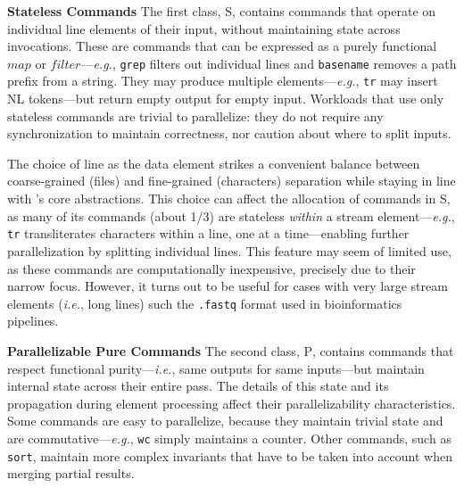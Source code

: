 \documentclass[letterpaper,twocolumn,10pt]{article}
\newcommand{\eg}{{\em e.g.}, }
\newcommand{\ie}{{\em i.e.}, }
\newcommand{\heading}[1]{\vspace{4pt}\noindent\textbf{#1}\enspace}
\newcommand{\ttt}[1]{\texttt{#1}}
\newcommand{\cn}[1]{\mbox{\textcircled{\footnotesize #1}}}
\newcommand{\sta}{\cn{\textsc{S}}\xspace}
\newcommand{\pur}{\cn{\textsc{P}}\xspace}
\newcommand{\nv}[1]{[{\color{cyan}nv: #1}]}
\begin{document}

\heading{Stateless Commands}
The first class, \sta, contains commands that operate on individual line elements of their input, without maintaining state across invocations.
These are commands that can be expressed as a purely functional $map$ or $filter$---\eg \ttt{grep} filters out individual lines and \ttt{basename} removes a path prefix from a string.
They may produce multiple elements---\eg \ttt{tr} may insert {\sc NL} tokens---but return empty output for empty input.
Workloads that use only stateless commands are trivial to parallelize:
  they do not require any synchronization to maintain correctness, nor caution about where to split inputs.

The choice of line as the data element strikes a convenient balance between coarse-grained (files) and fine-grained (characters) separation while staying in line with \unix's core abstractions.
This choice can affect the allocation of commands in \sta, as many of its commands (about 1/3) are stateless \emph{within} a stream element---\eg\ttt{tr} transliterates characters within a line, one at a time---enabling further parallelization by splitting individual lines.
This feature may seem of limited use, as these commands are computationally inexpensive, precisely due to their narrow focus.
However, it turns out to be  useful for cases with very large stream elements (\ie long lines) such the \ttt{.fastq} format used in bioinformatics pipelines.  %


\heading{Parallelizable Pure Commands}
The second class, \pur, contains commands that respect functional purity---\ie same outputs for same inputs---but maintain internal state across their entire pass.
The details of this state and its propagation during element processing affect their parallelizability characteristics.
Some commands are easy to parallelize, because they maintain trivial state and are commutative---\eg \ttt{wc} simply maintains a counter.
Other commands, such as \ttt{sort}, maintain more complex invariants that have to be taken into account when merging partial results.
% 
\end{document}
